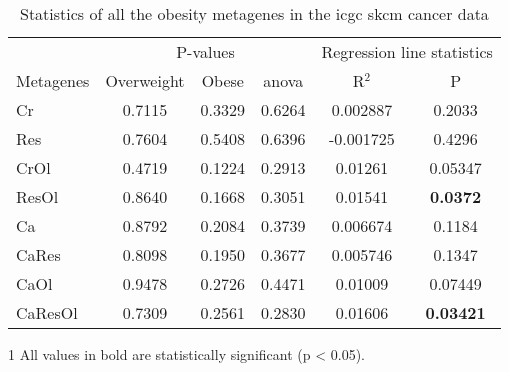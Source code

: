 \begin{appendices}
\begin{table}[htpb]
	\centering
	\caption[Statistics of all the obesity metagenes in the \gls{icgc} \acrshort{skcm} cancer data]{Statistics of all the obesity metagenes in the \gls{icgc} \gls{skcm} cancer data}
	\label{tab:degmetaskcm}
	\begin{threeparttable}
		\begin{tabular}{lccccc}
			& \multicolumn{3}{c}{ P-values} & \multicolumn{2}{c}{ Regression line statistics}\\
			\cmidrule(r){2-4} \cmidrule(r){5-6}
			Metagenes &  Overweight &  Obese &  \gls{anova} &  R$^2$ &  P \\
			\hline
			\hline
			\rule{0pt}{2.25ex}Cr      & 0.7115                      & 0.3329  & 0.6264             & 0.002887   & 0.2033              \\
			Res     & 0.7604                      & 0.5408  & 0.6396             & -0.001725  & 0.4296              \\
			CrOl    & 0.4719                      & 0.1224  & 0.2913             & 0.01261    & 0.05347             \\
			ResOl   & 0.8640                      & 0.1668  & 0.3051             & 0.01541    & {\bfseries 0.0372}\tnote{1}  \\
			Ca      & 0.8792                      & 0.2084  & 0.3739             & 0.006674   & 0.1184              \\
			CaRes   & 0.8098                      & 0.1950  & 0.3677             & 0.005746   & 0.1347              \\
			CaOl    & 0.9478                      & 0.2726  & 0.4471             & 0.01009    & 0.07449             \\
			CaResOl & 0.7309                      & 0.2561  & 0.2830             & 0.01606    & {\bfseries 0.03421} \\
			\hline
			\hline
		\end{tabular}
		\begin{tablenotes}
		\item [1] All values in bold are statistically significant (p \textless{} 0.05).
		\end{tablenotes}
	\end{threeparttable}
\end{table}


\end{appendices}
